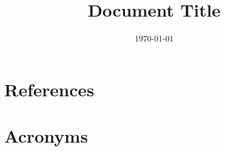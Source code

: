 \documentclass[modern]{aastex62}
\begin{document}

\date{\today}
\title{Document Title}





\appendix

\section{References} \label{sec:bib}



\section{Acronyms} \label{sec:acronyms}

\end{document}
